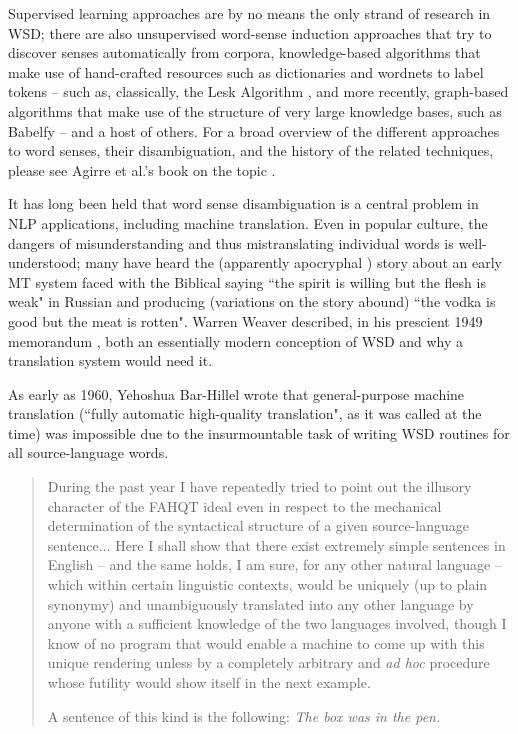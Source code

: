Supervised learning approaches are by no means the only strand of research in
WSD; there are also unsupervised word-sense induction approaches that try to
discover senses automatically from corpora, knowledge-based algorithms that
make use of hand-crafted resources such as dictionaries and wordnets to label
tokens -- such as, classically, the Lesk Algorithm \cite{lesk}, and more
recently, graph-based algorithms that make use of the structure of very large
knowledge bases, such as Babelfy \cite{moro2014entity} -- and a host of others.
For a broad overview of the different approaches to word senses, their
disambiguation, and the history of the related techniques, please see Agirre
et al.'s book on the topic \cite{agirre2006word}.

It has long been held that word sense disambiguation is a central problem in
NLP applications, including machine translation.
Even in popular culture, the dangers of misunderstanding and thus
mistranslating individual words is well-understood; many have heard the
(apparently apocryphal \cite{hutchins:whiskey}) story about an early MT system
faced with the Biblical saying ``the spirit is willing but the flesh is
weak" in Russian and producing (variations on the story abound) ``the vodka is
good but the meat is rotten".
Warren Weaver described, in his prescient 1949 memorandum \cite{weavermemo},
both an essentially modern conception of WSD and why a translation system would
need it.

As early as 1960, Yehoshua Bar-Hillel wrote that general-purpose machine
translation (``fully automatic high-quality  translation", as it was  called at
the  time) was impossible due to the insurmountable task of writing WSD
routines for all source-language words. \cite{barhillel1960}

\begin{quote}
During the past year I have repeatedly tried to point out the illusory
character of the FAHQT ideal even in respect to the mechanical determination of
the syntactical structure of a given source-language sentence... Here I shall
show that there exist extremely simple sentences in English -- and the same
holds, I am sure, for any other natural language -- which within certain
linguistic contexts, would be uniquely (up to plain synonymy) and unambiguously
translated into any other language by anyone with a sufficient knowledge of the
two languages involved, though I know of no program that would enable a machine
to come up with this unique rendering unless by a completely arbitrary and
\emph{ad hoc} procedure whose futility would show itself in the next example.

A sentence of this kind is the following: \emph{The box was in the pen.}
\end{quote}

